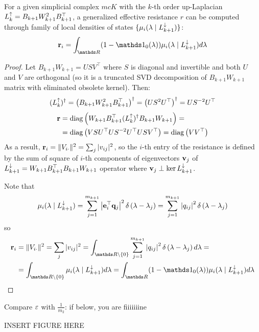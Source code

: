\begin{thm}\label{thm:GER_DOS}
      For a given simplicial complex \( mc K \) with the \(k\)-th order up-Laplacian \( L_{k}^{\uparrow} = B_{k+1} W_{k+1}^2 B_{k+1}^\top\), a generalized effective resistance \( r \) can be computed through family of local densities of states \( \{ \mu_i(\lambda \mid L_{k+1 }^{\downarrow}) \} \):
      \begin{equation}
            \b r_i = \int_{\ds R } (1 - \ds 1_0(\lambda)) \mu_i ( \lambda \mid \Ld {k+1} ) d\lambda 
      \end{equation}
\end{thm}
\begin{proof}
      Let \( B_{k+1} W_{k+1} = U S V^\top\) where \( S \) is diagonal and invertible and both \( U \) and \( V \) are orthogonal (so it is a truncated SVD decomposition of \( B_{k+1} W_{k+1} \) matrix with eliminated obsolete kernel). Then:
      \begin{equation}
            ( L_{k}^{\uparrow} )^\dagger = \left( B_{k+1} W_{k+1}^2 B_{k+1}^\top \right)^\dagger = \left( U S^2 U^\top \right)^\dagger = U S^{-2} U^\top
      \end{equation}
      \begin{equation}
            \begin{aligned}
                  \mathbf{r} & = \operatorname{diag} \left( W_{k+1} B_{k+1}^\top ( L_{k}^{\uparrow} )^\dagger B_{k+1} W_{k+1} \right)  =  \\
                  & = \operatorname{diag} \left(  V S U^\top U S^{-2} U^\top U S V^\top \right) = \operatorname{diag} \left(  V V^\top \right)
            \end{aligned}
      \end{equation}
      As a result, \( \mathbf{r}_i = \| V_{ i \cdot } \|^2 = \sum_j | v_{ij} |^2  \), so the \(i\)-th entry of the resistance is defined by the sum of square of \(i\)-th components of eigenvectors \( \mathbf{v}_j \) of \( L_{k+1}^{\downarrow} = W_{k+1} B_{k+1}^\top B_{k+1} W_{k+1} \) operator where \( \mathbf{v}_j \perp \ker L_{k+1}^{\downarrow} \).

      Note that 
      \begin{equation}
            \mu_i ( \lambda \mid L_{k+1}^{\downarrow} ) = \sum_{j=1}^{m_{k+1}} \left| \mathbf{e}_i^\top \mathbf{q}_j \right|^2 \delta \left( \lambda - \lambda_j \right)  = \sum_{j=1}^{m_{k+1}} \left| q_{ij} \right|^2 \delta \left( \lambda - \lambda_j \right) 
      \end{equation}
      so 
      \begin{equation}
            \begin{aligned}
                  \b r_i & = \| V_{ i \cdot } \|^2 = \sum_j | v_{ij} |^2 = \int_{ \ds R \backslash \{ 0 \} }  \sum_{j=1}^{m_{k+1}} \left| q_{ij} \right|^2 \delta \left( \lambda - \lambda_j \right)  d\lambda =\\
                  & = \int_{ \ds R \backslash \{ 0 \} } \mu_i ( \lambda \mid \Ld {k+1} ) d\lambda = \int_{\ds R } (1 - \ds 1_0(\lambda)) \mu_i ( \lambda \mid \Ld {k+1} ) d\lambda
            \end{aligned}
      \end{equation}
\end{proof}





\begin{remark}
      Compare \( \varepsilon \) with \( \frac{1}{m_2}\): if below, you are fiiiiiiine

      INSERT FIGURE HERE
\end{remark}